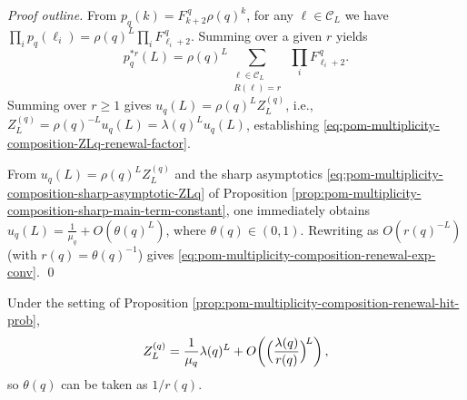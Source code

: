 \begin{proof}[Proof outline]
From \(p_q(k)=F_{k+2}^{\,q}\rho(q)^k\), for any \(\boldsymbol{\ell}\in\mathcal{C}_L\) we have
\(
\prod_i p_q(\ell_i)=\rho(q)^{L}\prod_i F_{\ell_i+2}^{\,q}
\).
Summing over a given \(r\) yields
\[
p_q^{*r}(L)=\rho(q)^L\sum_{\substack{\boldsymbol{\ell}\in\mathcal{C}_L\\ R(\boldsymbol{\ell})=r}}\ \prod_i F_{\ell_i+2}^{\,q}.
\]
Summing over \(r\ge 1\) gives
\(
u_q(L)=\rho(q)^L Z_L^{(q)}
\),
i.e., \(Z_L^{(q)}=\rho(q)^{-L}u_q(L)=\lambda(q)^L u_q(L)\), establishing \eqref{eq:pom-multiplicity-composition-ZLq-renewal-factor}.
\par
From \(u_q(L)=\rho(q)^L Z_L^{(q)}\) and the sharp asymptotics \eqref{eq:pom-multiplicity-composition-sharp-asymptotic-ZLq} of Proposition \ref{prop:pom-multiplicity-composition-sharp-main-term-constant},
one immediately obtains
\(
u_q(L)=\frac{1}{\mu_q}+O(\theta(q)^L)
\),
where \(\theta(q)\in(0,1)\).
Rewriting as \(O(r(q)^{-L})\) (with \(r(q)=\theta(q)^{-1}\)) gives \eqref{eq:pom-multiplicity-composition-renewal-exp-conv}. \qed
\end{proof}

\begin{corollary}\label{cor:pom-multiplicity-composition-sharp-main-term-from-renewal}
Under the setting of Proposition \ref{prop:pom-multiplicity-composition-renewal-hit-prob},
\[
Z_L^{(q)}=\frac{1}{\mu_q}\lambda(q)^L+O\!\left(\Bigl(\frac{\lambda(q)}{r(q)}\Bigr)^{\!L}\right),
\]
so \(\theta(q)\) can be taken as \(1/r(q)\).
\end{corollary}

